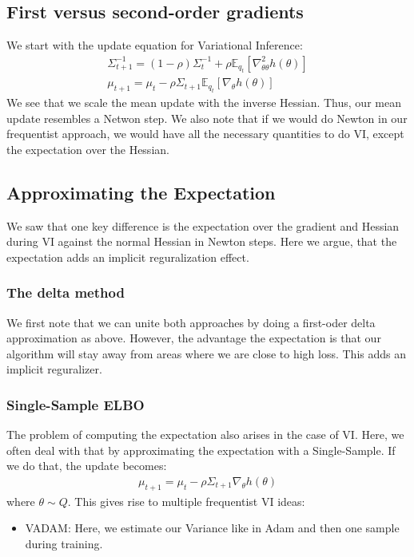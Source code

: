 \documentclass[a4paper]{scrartcl}
\begin{document}
  \subsection{First versus second-order gradients}
      We start with the update equation for Variational Inference:
      \begin{align*}
          \Sigma_{t+1}^{-1} = (1-\rho)\Sigma^{-1}_t + \rho \mathbb{E}_{q_t}[\nabla^2_{\theta\theta} h(\theta)]\\
          \mu_{t+1} = \mu_t - \rho \Sigma_{t+1}\mathbb{E}_{q_t}[\nabla_{\theta} h(\theta)]
      \end{align*}
      We see that we scale the mean update with the inverse Hessian. Thus,
      our mean update resembles a Netwon step. We also note that if we
      would do Newton in our frequentist approach, we would have all the
      necessary quantities to do VI, except the expectation over the
      Hessian.
  \subsection{Approximating the Expectation}    
      We saw that one key difference is the expectation over the gradient
      and Hessian during VI against the normal Hessian in Newton steps.
      Here we argue, that the expectation adds an implicit reguralization
      effect.

      \subsubsection{The delta method}
          We first note that we can unite both approaches by doing a
          first-oder delta approximation as above. However, the advantage the
          expectation is that our algorithm will stay away from areas where we
          are close to high loss. This adds an implicit reguralizer.

      \subsubsection{Single-Sample ELBO}
          The problem of computing the expectation also arises in the case
          of VI. Here, we often deal with that by approximating the
          expectation with a Single-Sample. If we do that, the update becomes:
          \begin{align*}
              \mu_{t+1} = \mu_t - \rho \Sigma_{t+1}\nabla_{\theta} h(\theta)
          \end{align*}
          where $\theta \sim Q$. This gives rise to multiple frequentist VI ideas:
          \begin{itemize}
              \item VADAM: Here, we estimate our Variance like in Adam and
              then one sample during training.
          \end{itemize}
\end{document}
